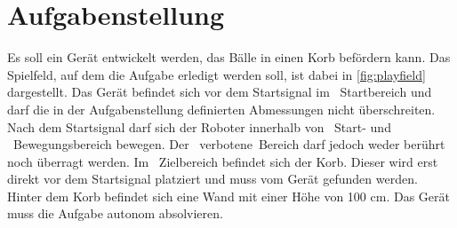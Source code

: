 \section{Aufgabenstellung}
\label{sec:aufgabe}
Es soll ein Gerät entwickelt werden, das Bälle in einen Korb befördern kann.  
Das Spielfeld, auf dem die Aufgabe erledigt werden soll, ist dabei in 
\autoref{fig:playfield} dargestellt. Das Gerät befindet sich vor dem 
Startsignal im \mbox{ 
Startbereich} und darf die in der Aufgabenstellung definierten Abmessungen nicht überschreiten. Nach dem Startsignal darf sich der Roboter innerhalb von 
\mbox{ Start}- und 
\mbox{ Bewegungsbereich} 
bewegen. Der \mbox{ 
verbotene Bereich} darf jedoch weder berührt noch überragt werden. Im 
\mbox{ Zielbereich} 
befindet sich der Korb. Dieser wird erst direkt vor dem Startsignal platziert 
und muss vom Gerät  gefunden werden. Hinter dem Korb befindet sich eine Wand 
mit einer Höhe von 100 cm. Das Gerät muss die Aufgabe autonom absolvieren. 
\cite{hslu:aufgabe}
